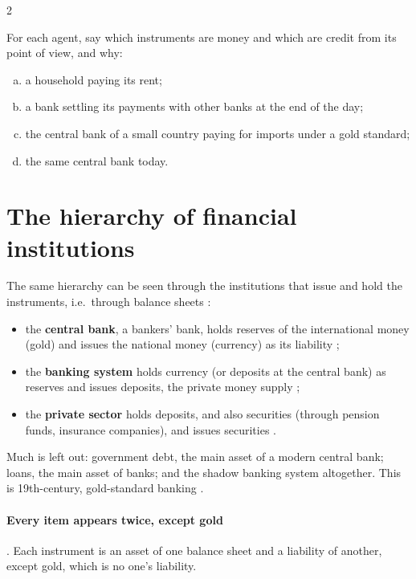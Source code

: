 \begin{paracol}{2}
\begin{exercise}
For each agent, say which instruments are money and which are credit from its point of view, and why:
\begin{enumerate}[(a)]
  \item a household paying its rent;
  \item a bank settling its payments with other banks at the end of the day;
  \item the central bank of a small country paying for imports under a gold standard;
  \item the same central bank today.
\end{enumerate}
\end{exercise}

\section{The hierarchy of financial institutions}\label{sec:nh-institutions}

The same hierarchy can be seen through the institutions that issue and hold the instruments, i.e.\ through
balance sheets :
\begin{itemize}
  \item the \textbf{central bank}, a bankers' bank, holds reserves of the international money (gold) and issues the
        national money (currency) as its liability ;
  \item the \textbf{banking system} holds currency (or deposits at the central bank) as reserves and issues deposits,
        the private money supply ;
  \item the \textbf{private sector} holds deposits, and also securities (through pension funds, insurance companies),
        and issues securities .
\end{itemize}
\begin{taccts}
\qquad
{}\qquad
{}
\end{taccts}
Much is left out: government debt, the main asset of a modern central bank; loans, the main asset of banks; and the
shadow banking system altogether. This is 19th-century, gold-standard banking .

\paragraph{Every item appears twice, except gold} . Each instrument is an asset of one balance sheet and
a liability of another, except gold, which is no one's liability.


\end{paracol}
